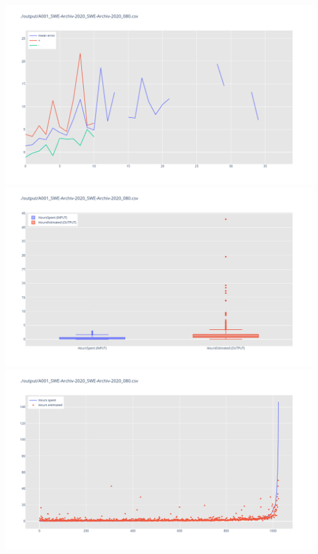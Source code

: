 \includegraphics[width=\textwidth]{Scripts/output/A001_SWE-Archiv-2020_SWE-Archiv-2020_080.csv.error_distribution.png}
\includegraphics[width=\textwidth]{Scripts/output/A001_SWE-Archiv-2020_SWE-Archiv-2020_080.csv.png}
\includegraphics[width=\textwidth]{Scripts/output/A001_SWE-Archiv-2020_SWE-Archiv-2020_080.csv.scatter.png}
